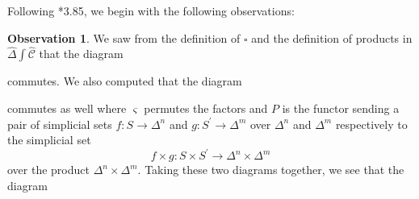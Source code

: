 \documentclass[a4paper]{article}
\numberwithin{equation}{subsection}
\theoremstyle{plain}   %
\theoremstyle{definition}
\newtheorem{obs}[equation]{Observation}
\theoremstyle{remark}
\theoremstyle{plain}
\DeclareMathOperator{\id}{id}
\newcommand{\overcat}[2]{{\left(#1\downarrow #2\right)}}
\newcommand{\psh}[1]{\ensuremath{\widehat{#1}}}
\providecommand{\C}{}
\renewcommand{\C}{\ensuremath{\mathcal{C}}}
\newcommand{\cellset}{\ensuremath{\widehat{\Theta[\mathcal{C}]}}}
\newcommand{\ssetlab}{\ensuremath{\widehat{\Delta} \int \widehat{\mathcal{C}}}}
\begin{document}
Following \cite{oury}*{3.85}, we begin with the following observations:

\begin{obs}\label{square1}
	We saw from the definition of \(\square\) and the definition of products in \(\ssetlab\) that the diagram 
	\begin{center}
	\end{center}
	commutes.  We also computed that the diagram
	\begin{center}
	\end{center}
	commutes as well where \(\varsigma\) permutes the factors and \(P\) is the functor sending a pair of simplicial sets \(f:S\to \Delta^n\) and \(g:S^\prime\to \Delta^m\) over \(\Delta^n\) and \(\Delta^m\) respectively to the simplicial set \[f\times g:S\times S^\prime \to \Delta^n\times \Delta^m\] over the product \(\Delta^n \times \Delta^m\).  Taking these two diagrams together, we see that the diagram 

\end{obs}
\end{document}
